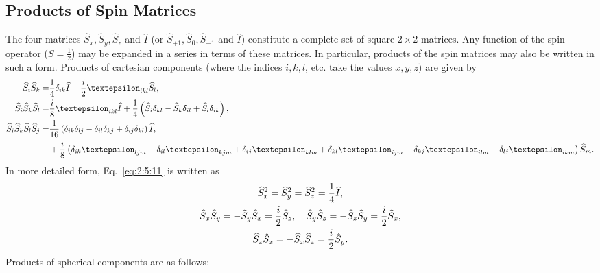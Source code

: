 \subsection{Products of Spin Matrices}
The four matrices $\widehat{S}_{x}, \widehat{S}_{y}, \widehat{S}_{z}$ and $\widehat{I}$ (or $\widehat{S}_{+1}, \widehat{S}_{0}, \widehat{S}_{-1}$ and $\widehat{I}$) constitute a complete set of square $2 \times 2$ matrices. Any function of the spin operator ($S=\frac{1}{2}$) may be expanded in a series in terms of these matrices. In particular, products of the spin matrices may also be written in such a form. Products of cartesian components (where the indices $i, k, l$, etc. take the values $x, y, z)$ are given by
\begin{align}
\widehat{S}_{i} \widehat{S}_{k}= & \frac{1}{4} \delta_{i k} \widehat{I}+\frac{i}{2} \varepsilon_{i k l} \widehat{S}_{l},  \label{eq:2:5:11}\\
\widehat{S}_{i} \widehat{S}_{k} \widehat{S}_{l}= & \frac{i}{8} \varepsilon_{i k l} \widehat{I}+\frac{1}{4}\left(\widehat{S}_{i} \delta_{k l}-\widehat{S}_{k} \delta_{i l}+\widehat{S}_{l} \delta_{i k}\right)  ,\label{eq:2:5:12}\\
\widehat{S}_{i} \widehat{S}_{k} \widehat{S}_{l} \widehat{S}_{j}= & \frac{1}{16}\left(\delta_{i k} \delta_{l j}-\delta_{i l} \delta_{k j}+\delta_{i j} \delta_{k l}\right) \widehat{I} , \notag\\
& +\frac{i}{8}\left(\delta_{i k} \varepsilon_{l j m}-\delta_{i l} \varepsilon_{k j m}+\delta_{i j} \varepsilon_{k l m}+\delta_{k l} \varepsilon_{i j m}-\delta_{k j} \varepsilon_{i l m}+\delta_{l j} \varepsilon_{i k m}\right) \widehat{S}_{m} .\label{eq:2:5:13}
\end{align}
In more detailed form, Eq.~\eqref{eq:2:5:11} is written as
\begin{gather}
\widehat{S}_{x}^{2}=\widehat{S}_{y}^{2}=\widehat{S}_{z}^{2}=\frac{1}{4} \widehat{I} , \notag\\
\widehat{S}_{x} \widehat{S}_{y}=-\widehat{S}_{y} \widehat{S}_{x}=\frac{i}{2} \widehat{S}_{z}, \quad \widehat{S}_{y} \widehat{S}_{z}=-\widehat{S}_{z} \widehat{S}_{y}=\frac{i}{2} \widehat{S}_{x}  ,\label{eq:2:5:14}\\
\widehat{S}_{z} \hat{S}_{x}=-\widehat{S}_{x} \widehat{S}_{z}=\frac{i}{2} \hat{S}_{y}. \notag
\end{gather}
Products of spherical components are as follows:
